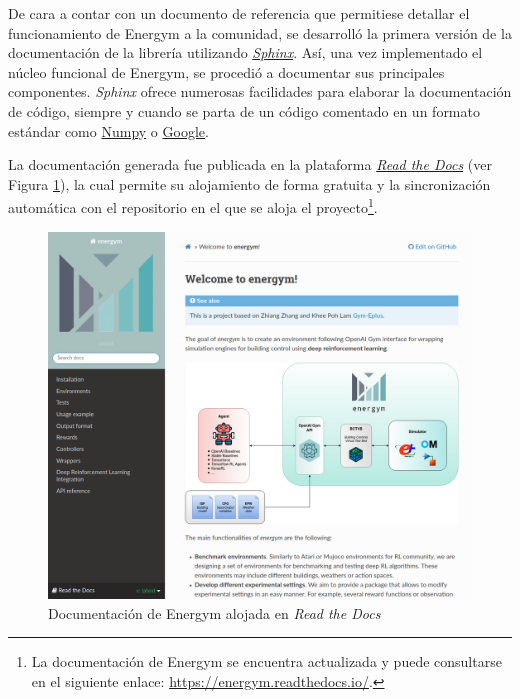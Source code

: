 De cara a contar con un documento de referencia que permitiese detallar el funcionamiento de Energym a la comunidad, se desarrolló la primera versión de la documentación de la librería utilizando \href{https://www.sphinx-doc.org}{\textit{Sphinx}}. Así, una vez implementado el núcleo funcional de Energym, se procedió a documentar sus principales componentes. \textit{Sphinx} ofrece numerosas facilidades para elaborar la documentación de código, siempre y cuando se parta de un código comentado en un formato estándar como \href{https://www.sphinx-doc.org/en/master/usage/extensions/example_numpy.html?highlight=numpy#example-numpy-style-python-docstrings}{Numpy} o \href{https://www.sphinx-doc.org/en/master/usage/extensions/example_google.html#example-google}{Google}.

La documentación generada fue publicada en la plataforma \href{readthedocs.org}{\textit{Read the Docs}} (ver Figura \ref{fig:readthedocs}), la cual permite su alojamiento de forma gratuita y la sincronización automática con el repositorio en el que se aloja el proyecto\footnote{La documentación de Energym se encuentra actualizada y puede consultarse en el siguiente enlace: \url{https://energym.readthedocs.io/}.}.

\begin{figure}
    \centering
    \includegraphics[width=\textwidth]{imagenes/readthedocs.png}
    \caption{Documentación de Energym alojada en \textit{Read the Docs}}
    \label{fig:readthedocs}
\end{figure}


